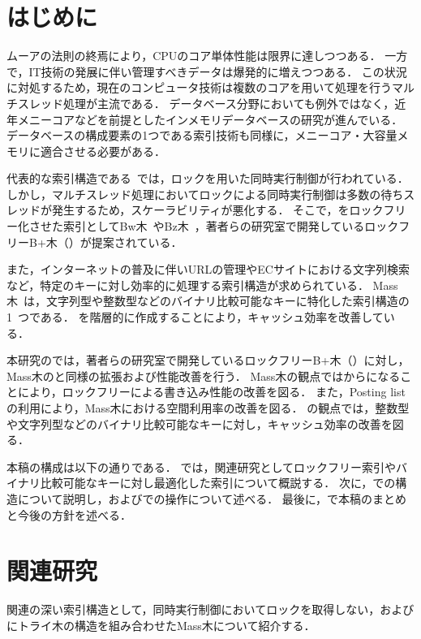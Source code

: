 
\section{はじめに}
ムーアの法則の終焉により，CPUのコア単体性能は限界に達しつつある．
一方で，IT技術の発展に伴い管理すべきデータは爆発的に増えつつある．
この状況に対処するため，現在のコンピュータ技術は複数のコアを用いて処理を行うマルチスレッド処理が主流である．
データベース分野においても例外ではなく，近年メニーコアなどを前提としたインメモリデータベースの研究が進んでいる．
データベースの構成要素の1つである索引技術も同様に，メニーコア・大容量メモリに適合させる必要がある．

代表的な索引構造である\Bptree{}~\cite{book:dbsystem}では，ロックを用いた同時実行制御が行われている．
しかし，マルチスレッド処理においてロックによる同時実行制御は多数の待ちスレッドが発生するため，スケーラビリティが悪化する．
そこで，\Bptree{}をロックフリー化させた索引としてBw木~\cite{book:Bwtree}やBz木~\cite{book:Bztree}，著者らの研究室で開発しているロックフリーB+木（\Bctree{}）が提案されている．

また，インターネットの普及に伴いURLの管理やECサイトにおける文字列検索など，特定のキーに対し効率的に処理する索引構造が求められている．
Mass木~\cite{book:Masstree}は，文字列型や整数型などのバイナリ比較可能なキーに特化した索引構造の1~つである．
\Bptree{}を階層的に作成することにより，キャッシュ効率を改善している．

本研究の\Bcforest{}では，著者らの研究室で開発しているロックフリーB+木（\Bctree{}）に対し，Mass木のと同様の拡張および性能改善を行う．
Mass木の観点では\Bptree{}から\Bctree{}になることにより，ロックフリーによる書き込み性能の改善を図る．
また，Posting listの利用により，Mass木における空間利用率の改善を図る．
\Bctree{}の観点では，整数型や文字列型などのバイナリ比較可能なキーに対し，キャッシュ効率の改善を図る．


本稿の構成は以下の通りである．
\Sec{\ref{sec:relatedwork}}では，関連研究としてロックフリー索引やバイナリ比較可能なキーに対し最適化した索引について概説する．
次に，\Sec{\ref{sec:bc_forest_structure}}で\Bcforest{}の構造について説明し，\Sec{\ref{sec:node_operation}}および\Sec{\ref{sec:smo}}で\Bcforest{}の操作について述べる．
最後に，\Sec{\ref{sec:conclusion}}で本稿のまとめと今後の方針を述べる．

\section{関連研究}
\label{sec:relatedwork}
関連の深い索引構造として，同時実行制御においてロックを取得しない\Bctree{}，および\Bptree{}にトライ木の構造を組み合わせたMass木について紹介する．

